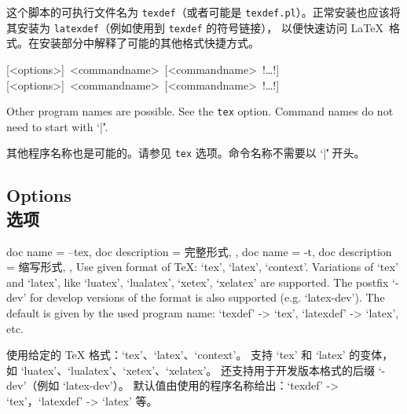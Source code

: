 \documentclass{article}
\begin{document}
这个脚本的可执行文件名为 \texttt{texdef}（或者可能是 \texttt{texdef.pl}）。正常安装也应该将其安装为 \texttt{latexdef}（例如使用到 \texttt{texdef} 的符号链接），
以便快速访问 \LaTeX\ 格式。在安装部分中解释了可能的其他格式快捷方式。

\parindent=0pt
[<options>]~<commandname>~[<commandname>~!\ldots!]
[<options>]~<commandname>~[<commandname>~!\ldots!]


Other program names are possible. See the \texttt{tex} option.  Command names do not need to start with `|\|'.

其他程序名称也是可能的。请参见 \texttt{tex} 选项。命令名称不需要以 `|\|' 开头。

\subsection*{Options\\选项}

\begin{parcolumns}[rulebetween=true,colwidths={2=.6\linewidth}]{2}
\end{parcolumns}


\begin{docKeys}[
  doc no index,   %
  doc parameter = {~\meta{format}},
]
{
  {
    doc name        = --tex,
    doc description = 完整形式,
  },
  {
    doc name        = -t,
    doc description = 缩写形式,
  },
}
Use given format of TeX: `tex', `latex', `context'.
Variations of `tex' and `latex', like `luatex', `lualatex', `xetex', `xelatex' are supported.
The postfix `-dev' for develop versions of the format is also supported (e.g. `latex-dev').
The default is given by the used program name: `texdef' -> `tex', `latexdef' -> `latex', etc.

%
使用给定的 TeX 格式：`tex’、`latex'、`context'。 支持 `tex' 和 `latex' 的变体，如 `luatex'、`lualatex'、`xetex'、`xelatex'。 还支持用于开发版本格式的后缀 `-dev'（例如 `latex-dev'）。 默认值由使用的程序名称给出：`texdef' -> `tex'，`latexdef' -> `latex' 等。
\end{docKeys}
  
\end{document}
